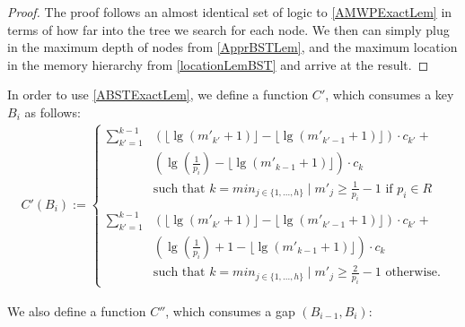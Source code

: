 \documentclass[letterpaper,12pt,titlepage,oneside,final]{book}
\theoremstyle{plain}
\begin{document}
\begin{proof}
The proof follows an almost identical set of logic to \ref{AMWPExactLem} in terms of how far into the tree we search for each node. We then can simply plug in the maximum depth of nodes from \ref{ApprBSTLem}, and the maximum location in the memory hierarchy from \ref{locationLemBST} and arrive at the result.
\end{proof}


In order to use \ref{ABSTExactLem}, we define a function $C'$, which consumes a key $B_i$ as follows:
\begin{align*} 
C'(B_i) := 
\begin{cases}
 \sum_{k'=1}^{k-1} &\left(\lfloor \lg(m'_{k'}+1) \rfloor - \lfloor \lg(m'_{k'-1}+1) \rfloor \right)\cdot c_{k'}+ \\
 &\left(\lg(\frac{1}{p_i}) - \lfloor \lg(m'_{k-1}+1) \rfloor \right)\cdot c_k\\
&\text{such that } k=min_{j \in \{1, ..., h\}} \mid m'_j \geq \frac{1}{p_i}-1 \text{ if } p_i \in R \\\\
 \sum_{k'=1}^{k-1} &\left(\lfloor \lg(m'_{k'}+1) \rfloor - \lfloor \lg(m'_{k'-1}+1) \rfloor \right)\cdot c_{k'}+ \\
 &\left(\lg(\frac{1}{p_i}) + 1 - \lfloor \lg(m'_{k-1}+1) \rfloor \right)\cdot c_k\\
&\text{such that } k=min_{j \in \{1, ..., h\}} \mid m'_j \geq \frac{2}{p_i}-1 \text{ otherwise.}  
\end{cases}
\end{align*}

We also define a function $C''$, which consumes a gap $(B_{i-1},B_i)$:
\end{document}

